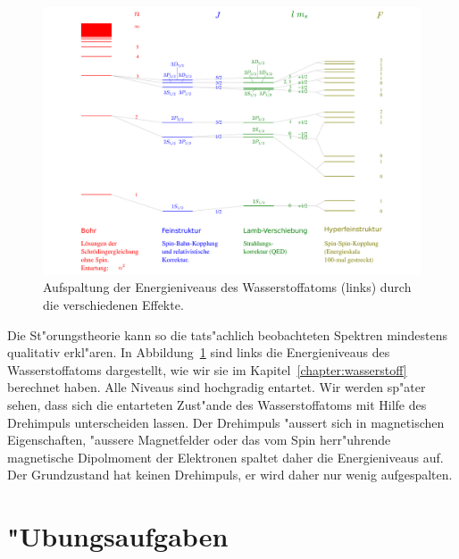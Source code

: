 \begin{figure}
\centering
\includegraphics[width=\hsize]{images/WasserstoffAufspaltung.pdf}
\caption{Aufspaltung der Energieniveaus des Wasserstoffatoms (links)
durch die verschiedenen Effekte.
\label{skript:wasserstoffaufspaltung}}
\end{figure}
Die St"orungstheorie kann so die tats"achlich beobachteten Spektren
mindestens qualitativ erkl"aren.
In Abbildung~\ref{skript:wasserstoffaufspaltung} sind links die Energieniveaus
des Wasserstoffatoms dargestellt, wie wir sie im Kapitel~\ref{chapter:wasserstoff}
berechnet haben.
Alle Niveaus sind hochgradig entartet.
Wir werden sp"ater sehen, dass sich die entarteten Zust"ande des
Wasserstoffatoms mit Hilfe des Drehimpuls unterscheiden lassen.
Der Drehimpuls "aussert sich in magnetischen Eigenschaften,
"aussere Magnetfelder oder das vom Spin herr"uhrende magnetische Dipolmoment
der Elektronen spaltet daher die Energieniveaus auf.
Der Grundzustand hat keinen Drehimpuls, er wird daher nur wenig
aufgespalten.

%
%

\section*{"Ubungsaufgaben}
\begin{uebungsaufgaben}
\item

\item

\item

\end{uebungsaufgaben}
